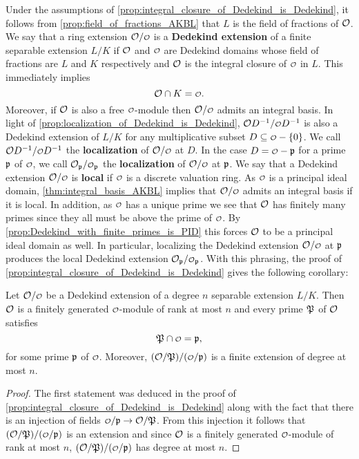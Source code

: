     Under the assumptions of \cref{prop:integral_closure_of_Dedekind_is_Dedekind}, it follows from \cref{prop:field_of_fractions_AKBL} that $L$ is the field of fractions of $\mathcal{O}$. We say that a ring extension $\mc{O}/\smc{O}$ is a \textbf{Dedekind extension} of a finite separable extension $L/K$ if $\mathcal{O}$ and $\smc{O}$ are Dedekind domains whose field of fractions are $L$ and $K$ respectively and $\mathcal{O}$ is the integral closure of $\smc{O}$ in $L$. This immediately implies
    \[
      \mc{O} \cap K = \smc{O}.
    \]
    Moreover, if $\mathcal{O}$ is also a free $\smc{O}$-module then $\mc{O}/\smc{O}$ admits an integral basis. In light of \cref{prop:localization_of_Dedekind_is_Dedekind}, $\mc{O}D^{-1}/\smc{O}D^{-1}$ is also a Dedekind extension of $L/K$ for any multiplicative subset $D \subseteq \smc{O}-\{0\}$. We call $\mc{O}D^{-1}/\smc{O}D^{-1}$ the \textbf{localization} of $\mc{O}/\smc{O}$ at $D$. In the case $D = \smc{O}-\mf{p}$ for a prime $\mathfrak{p}$ of $\smc{O}$, we call $\mc{O}_{\mf{p}}/\smc{O}_{\mf{p}}$ the \textbf{localization} of $\mc{O}/\smc{O}$ at $\mathfrak{p}$. We say that a Dedekind extension $\mc{O}/\smc{O}$ is \textbf{local} if $\smc{O}$ is a discrete valuation ring. As $\smc{O}$ is a principal ideal domain, \cref{thm:integral_basis_AKBL} implies that $\mc{O}/\smc{O}$ admits an integral basis if it is local. In addition, as $\smc{O}$ has a unique prime we see that $\mathcal{O}$ has finitely many primes since they all must be above the prime of $\smc{O}$. By \cref{prop:Dedekind_with_finite_primes_is_PID} this forces $\mathcal{O}$ to be a principal ideal domain as well. In particular, localizing the Dedekind extension $\mc{O}/\smc{O}$ at $\mathfrak{p}$ produces the local Dedekind extension $\mc{O}_{\mf{p}}/\smc{O}_{\mf{p}}$. With this phrasing, the proof of \cref{prop:integral_closure_of_Dedekind_is_Dedekind} gives the following corollary:

    \begin{corollary}\label{cor:integral_closure_of_Dedekind_is_Dedekind}
      Let $\mc{O}/\smc{O}$ be a Dedekind extension of a degree $n$ separable extension $L/K$. Then $\mathcal{O}$ is a finitely generated $\smc{O}$-module of rank at most $n$ and every prime $\mathfrak{P}$ of $\mathcal{O}$ satisfies
      \[
        \mf{P} \cap \smc{O} = \mf{p},
      \]
      for some prime $\mathfrak{p}$ of $\smc{O}$. Moreover, $(\mc{O}/\mf{P})/(\smc{O}/\mf{p})$ is a finite extension of degree at most $n$.
    \end{corollary}
    \begin{proof}
      The first statement was deduced in the proof of \cref{prop:integral_closure_of_Dedekind_is_Dedekind} along with the fact that there is an injection of fields $\smc{O}/\mf{p} \to \mc{O}/\mf{P}$. From this injection it follows that $(\mc{O}/\mf{P})/(\smc{O}/\mf{p})$ is an extension and since $\mathcal{O}$ is a finitely generated $\smc{O}$-module of rank at most $n$, $(\mc{O}/\mf{P})/(\smc{O}/\mf{p})$ has degree at most $n$.
    \end{proof}

